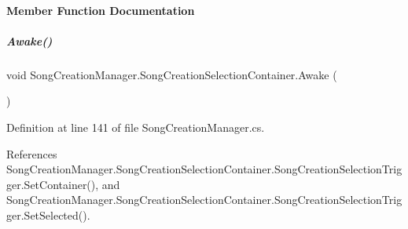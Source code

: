 \paragraph{Member Function Documentation}
\mbox{\label{group___s_c_m_nest_class_a786a838268b7102ae38c546100c3e6ac}} 
\subparagraph{\texorpdfstring{Awake()}{Awake()}}
{\footnotesize\ttfamily void Song\+Creation\+Manager.\+Song\+Creation\+Selection\+Container.\+Awake (\begin{DoxyParamCaption}{ }\end{DoxyParamCaption})\hspace{0.3cm}{\ttfamily [private]}}



Definition at line 141 of file Song\+Creation\+Manager.\+cs.



References Song\+Creation\+Manager.\+Song\+Creation\+Selection\+Container.\+Song\+Creation\+Selection\+Trigger.\+Set\+Container(), and Song\+Creation\+Manager.\+Song\+Creation\+Selection\+Container.\+Song\+Creation\+Selection\+Trigger.\+Set\+Selected().


